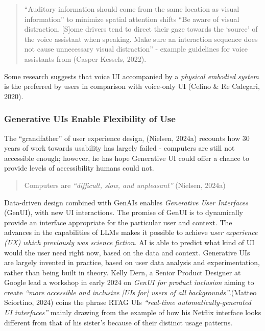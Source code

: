 \documentclass[
  letterpaper,
  DIV=11,
  numbers=noendperiod]{scrartcl}
\begin{document}
\begin{quote}
``Auditory information should come from the same location as visual
information'' to minimize spatial attention shifts ``Be aware of visual
distraction. {[}S{]}ome drivers tend to direct their gaze towards the
`source' of the voice assistant when speaking. Make sure an interaction
sequence does not cause unnecessary visual distraction'' - example
guidelines for voice assistants from (Casper Kessels, 2022).
\end{quote}

Some research suggests that voice UI accompanied by a \emph{physical
embodied system} is the preferred by users in comparison with voice-only
UI (Celino \& Re Calegari, 2020).

\subsubsection{Generative UIs Enable Flexibility of
Use}\label{generative-uis-enable-flexibility-of-use}

The ``grandfather'' of user experience design, (Nielsen, 2024a) recounts
how 30 years of work towards usability has largely failed - computers
are still not accessible enough; however, he has hope Generative UI
could offer a chance to provide levels of accessibility humans could
not.

\begin{quote}
Computers are \emph{``difficult, slow, and unpleasant''} (Nielsen,
2024a)
\end{quote}

Data-driven design combined with GenAIs enables \emph{Generative User
Interfaces} (GenUI), with new UI interactions. The promise of GenUI is
to dynamically provide an interface appropriate for the particular user
and context. The advances in the capabilities of LLMs makes it possible
to achieve \emph{user experience (UX) which previously was science
fiction}. AI is able to predict what kind of UI would the user need
right now, based on the data and context. Generative UIs are largely
invented in practice, based on user data analysis and experimentation,
rather than being built in theory. Kelly Dern, a Senior Product Designer
at Google lead a workshop in early 2024 on \emph{GenUI for product
inclusion} aiming to create \emph{``more accessible and inclusive {[}UIs
for{]} users of all backgrounds''}.(Matteo Sciortino, 2024) coins the
phrase RTAG UIs \emph{``real-time automatically-generated UI
interfaces''} mainly drawing from the example of how his Netflix
interface looks different from that of his sister's because of their
distinct usage patterns.
\end{document}
